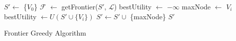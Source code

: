 \begin{algorithm}
  \begin{algorithmic}[1]
  \State $S' \gets$ \{$V_0$\}  
      \State $\mathcal{F}$ $\gets$ getFrontier($S'$, $\mathcal{L}$)
      \State bestUtility $\gets$ $-\infty$
      \State maxNode $\gets$ $V_i$
      \State bestUtility $\gets U(S' \cup \{V_i\})$
      \EndIf
      \EndFor
      \State $S' \gets S' \cup$ \{maxNode\}
  \EndWhile
  \Return $S'$
  \EndProcedure
  \end{algorithmic}
  \caption{Frontier Greedy Algorithm}\label{algo:frontier_greedy}
\end{algorithm}
